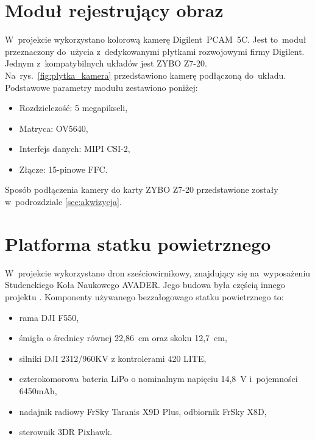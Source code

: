 \section{Moduł rejestrujący obraz}
\label{sec:pcam}

W~projekcie wykorzystano kolorową kamerę Digilent~PCAM~5C. 
Jest to~moduł przeznaczony do~użycia z~dedykowanymi płytkami rozwojowymi firmy Digilent. 
Jednym z~kompatybilnych układów jest ZYBO Z7-20. 
Na~rys.~\ref{fig:plytka_kamera} przedstawiono kamerę podłączoną do~układu.
Podstawowe parametry modułu zestawiono poniżej:

\begin{itemize}
	\item Rozdzielczość: 5 megapikseli,
	\item Matryca: OV5640,
	\item Interfejs danych: MIPI CSI-2,
	\item Złącze: 15-pinowe FFC.
\end{itemize}

Sposób podłączenia kamery do karty ZYBO Z7-20 przedstawione zostały w~podrozdziale \ref{sec:akwizycja}.

\section{Platforma statku powietrznego}
\label{sec:platforma_statku_powietrznego}

W~projekcie wykorzystano dron sześciowirnikowy, znajdujący się na~wyposażeniu Studenckiego Koła Naukowego AVADER. 
Jego budowa była częścią innego projektu \cite{mgr}. 
Komponenty używanego bezzałogowago statku powietrznego to:
\begin{itemize}
	\item rama DJI F550,
	\item śmigła o średnicy równej 22,86~cm oraz skoku 12,7~cm,
	\item silniki DJI 2312/960KV z kontrolerami 420 LITE,
	\item czterokomorowa bateria LiPo o nominalnym napięciu 14,8~V i~pojemności 6450mAh, 
	\item nadajnik radiowy FrSky Taranis X9D Plus, odbiornik FrSky X8D,
	\item sterownik 3DR Pixhawk.
\end{itemize}

